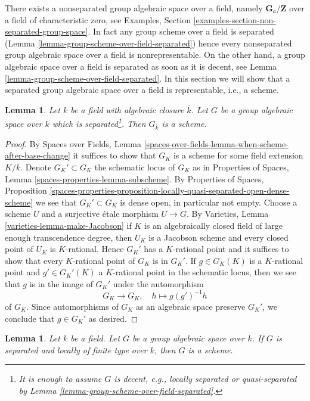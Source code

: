 \documentclass{stacks-project}
\theoremstyle{plain}
\newtheorem{lemma}[subsection]{Lemma}
\theoremstyle{definition}
\theoremstyle{remark}
\numberwithin{equation}{subsection}
\begin{document}
\noindent
There exists a nonseparated group algebraic space over a field,
namely $\mathbf{G}_a/\mathbf{Z}$ over a field of characteristic zero, see
Examples, Section \ref{examples-section-non-separated-group-space}.
In fact any group scheme over a field is separated
(Lemma \ref{lemma-group-scheme-over-field-separated})
hence every nonseparated group algebraic space over a field
is nonrepresentable. On the other hand, a group algebraic
space over a field is separated as soon as it is decent, see
Lemma \ref{lemma-group-scheme-over-field-separated}.
In this section we will show that
a separated group algebraic space over a field
is representable, i.e., a scheme.

\begin{lemma}
\label{lemma-group-space-scheme-over-kbar}
Let $k$ be a field with algebraic closure $\overline{k}$.
Let $G$ be a group algebraic space over $k$
which is separated\footnote{It is enough to assume $G$ is decent,
e.g., locally separated or quasi-separated by
Lemma \ref{lemma-group-scheme-over-field-separated}.}.
Then $G_{\overline{k}}$ is a scheme.
\end{lemma}

\begin{proof}
By Spaces over Fields, Lemma
\ref{spaces-over-fields-lemma-when-scheme-after-base-change}
it suffices to show that $G_K$ is a scheme for some field
extension $K/k$. Denote $G_K' \subset G_K$ the schematic
locus of $G_K$ as in Properties of Spaces, Lemma
\ref{spaces-properties-lemma-subscheme}.
By Properties of Spaces, Proposition
\ref{spaces-properties-proposition-locally-quasi-separated-open-dense-scheme}
we see that $G_K' \subset G_K$ is dense open, in particular not empty.
Choose a scheme $U$ and a surjective \'etale morphism $U \to G$. By
Varieties, Lemma \ref{varieties-lemma-make-Jacobson}
if $K$ is an algebraically closed field of large enough
transcendence degree, then $U_K$ is a Jacobson scheme and
every closed point of $U_K$ is $K$-rational.
Hence $G_K'$ has a $K$-rational point and it suffices
to show that every $K$-rational point of $G_K$ is in $G_K'$.
If $g \in G_K(K)$ is a $K$-rational point and $g' \in G_K'(K)$
a $K$-rational point in the schematic locus, then we see that
$g$ is in the image of $G_K'$ under the automorphism
$$
G_K \longrightarrow G_K,\quad
h \longmapsto g(g')^{-1}h
$$
of $G_K$. Since automorphisms of $G_K$ as an algebraic space preserve
$G_K'$, we conclude that $g \in G_K'$ as desired.
\end{proof}

\begin{lemma}
\label{lemma-group-space-scheme-locally-finite-type-over-k}
Let $k$ be a field. Let $G$ be a group algebraic space over $k$.
If $G$ is separated and locally of finite type over $k$,
then $G$ is a scheme.
\end{lemma}
\end{document}

